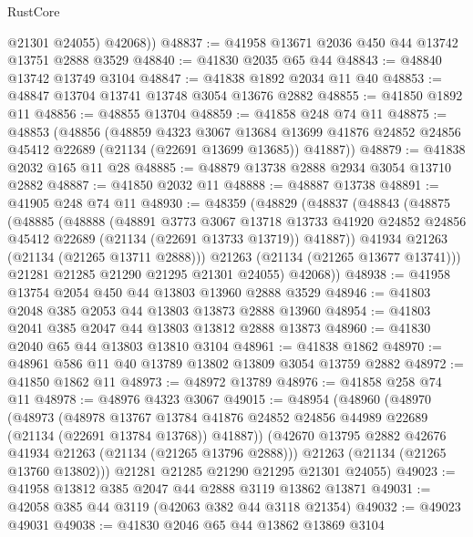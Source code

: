 \begin{lexlean}{RustCore}
\begin{coremodule}
          @21301
          @24055)
        @42068))
@48837 := @41958 @13671 @2036 @450 @44 @13742 @13751 @2888 @3529
@48840 := @41830 @2035 @65 @44
@48843 := @48840 @13742 @13749 @3104
@48847 := @41838 @1892 @2034 @11 @40
@48853 := @48847 @13704 @13741 @13748 @3054 @13676 @2882
@48855 := @41850 @1892 @11
@48856 := @48855 @13704
@48859 := @41858 @248 @74 @11
@48875 := @48853
    (@48856
      (@48859
        @4323
        @3067
        @13684
        @13699
        @41876
        @24852
        @24856
        @45412
        @22689
        (@21134 (@22691 @13699 @13685))
        @41887))
@48879 := @41838 @2032 @165 @11 @28
@48885 := @48879 @13738 @2888 @2934 @3054 @13710 @2882
@48887 := @41850 @2032 @11
@48888 := @48887 @13738
@48891 := @41905 @248 @74 @11
@48930 := @48359
    (@48829
      (@48837
        (@48843
          (@48875
            (@48885
              (@48888
                (@48891
                  @3773
                  @3067
                  @13718
                  @13733
                  @41920
                  @24852
                  @24856
                  @45412
                  @22689
                  (@21134 (@22691 @13733 @13719))
                  @41887))
              @41934
              @21263
              (@21134 (@21265 @13711 @2888)))
            @21263
            (@21134 (@21265 @13677 @13741)))
          @21281
          @21285
          @21290
          @21295
          @21301
          @24055)
        @42068))
@48938 := @41958 @13754 @2054 @450 @44 @13803 @13960 @2888 @3529
@48946 := @41803 @2048 @385 @2053 @44 @13803 @13873 @2888 @13960
@48954 := @41803 @2041 @385 @2047 @44 @13803 @13812 @2888 @13873
@48960 := @41830 @2040 @65 @44 @13803 @13810 @3104
@48961 := @41838 @1862
@48970 := @48961 @586 @11 @40 @13789 @13802 @13809 @3054 @13759 @2882
@48972 := @41850 @1862 @11
@48973 := @48972 @13789
@48976 := @41858 @258 @74 @11
@48978 := @48976 @4323 @3067
@49015 := @48954
    (@48960
      (@48970
        (@48973
          (@48978
            @13767
            @13784
            @41876
            @24852
            @24856
            @44989
            @22689
            (@21134 (@22691 @13784 @13768))
            @41887))
        (@42670 @13795 @2882 @42676 @41934 @21263 (@21134 (@21265 @13796 @2888)))
        @21263
        (@21134 (@21265 @13760 @13802)))
      @21281
      @21285
      @21290
      @21295
      @21301
      @24055)
@49023 := @41958 @13812 @385 @2047 @44 @2888 @3119 @13862 @13871
@49031 := @42058 @385 @44 @3119 (@42063 @382 @44 @3118 @21354)
@49032 := @49023 @49031
@49038 := @41830 @2046 @65 @44 @13862 @13869 @3104

\end{coremodule}
\end{lexlean}
